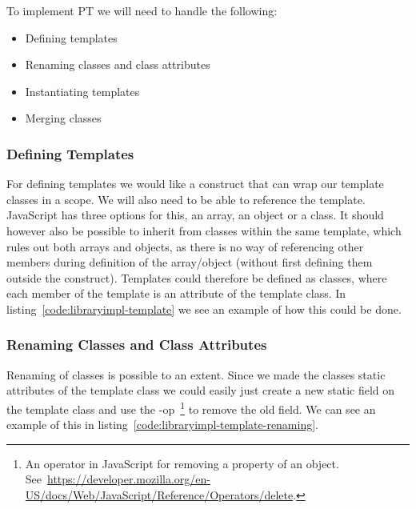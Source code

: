 To implement PT we will need to handle the following:

\begin{itemize}
    \item Defining templates
    \item Renaming classes and class attributes
    \item Instantiating templates
    \item Merging classes
\end{itemize}

\subsubsection{Defining Templates}\label{subsubsec:defining-templates}

For defining templates we would like a construct that can wrap our template classes in a scope.
We will also need to be able to reference the template.
JavaScript has three options for this, an array, an object or a class.
It should however also be possible to inherit from classes within the same template, which rules out both arrays and objects, as there is no way of referencing other members during definition of the array/object (without first defining them outside the construct).
Templates could therefore be defined as classes, where each member of the template is an attribute of the template class.
In listing~\vref{code:libraryimpl-template} we see an example of how this could be done.


\subsubsection{Renaming Classes and Class Attributes}\label{subsubsec:renaming-classes-and-class-attributes}

Renaming of classes is possible to an extent.
Since we made the classes static attributes of the template class we could easily just create a new static field on the template class and use the -op~\footnote{An operator in JavaScript for removing a property of an object. See~\url{https://developer.mozilla.org/en-US/docs/Web/JavaScript/Reference/Operators/delete}.} to remove the old field.
We can see an example of this in listing~\vref{code:libraryimpl-template-renaming}.



